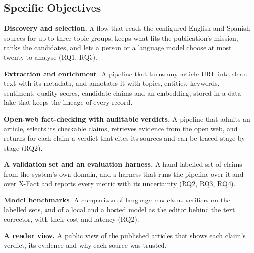 
\subsection{Specific Objectives}

\begin{description}[leftmargin=1.2cm,labelwidth=1cm]
    \item[O1] \textbf{Discovery and selection.} A flow that reads the
    configured English and Spanish sources for up to three topic
    groups, keeps what fits the publication's mission, ranks the
    candidates, and lets a person or a language model choose at most
    twenty to analyse (RQ1, RQ3).
    \item[O2] \textbf{Extraction and enrichment.} A pipeline that turns
    any article URL into clean text with its metadata, and annotates it
    with topics, entities, keywords, sentiment, quality scores,
    candidate claims and an embedding, stored in a data lake that keeps
    the lineage of every record.
    \item[O3] \textbf{Open-web fact-checking with auditable verdicts.}
    A pipeline that admits an article, selects its checkable claims,
    retrieves evidence from the open web, and returns for each claim a
    verdict that cites its sources and can be traced stage by stage
    (RQ2).
    \item[O4] \textbf{A validation set and an evaluation harness.} A
    hand-labelled set of claims from the system's own domain, and a
    harness that runs the pipeline over it and over X-Fact and reports
    every metric with its uncertainty (RQ2, RQ3, RQ4).
    \item[O5] \textbf{Model benchmarks.} A comparison of language
    models as verifiers on the labelled sets, and of a local and a
    hosted model as the editor behind the text corrector, with their
    cost and latency (RQ2).
    \item[O6] \textbf{A reader view.} A public view of the published
    articles that shows each claim's verdict, its evidence and why each
    source was trusted.
\end{description}
